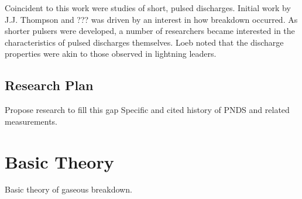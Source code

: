 Coincident to this work were studies of short, pulsed discharges. Initial work
by J.J. Thompson and ???  was driven by an interest in
how breakdown occurred. As shorter pulsers were developed, a number of
researchers became interested in the characteristics of pulsed discharges
themselves. Loeb  noted that the discharge properties were akin
to those observed in lightning leaders. 

\subsection{Research Plan}

Propose research to fill this gap
Specific and cited history of PNDS and related measurements.

\section{Basic Theory}

Basic theory of gaseous breakdown.
